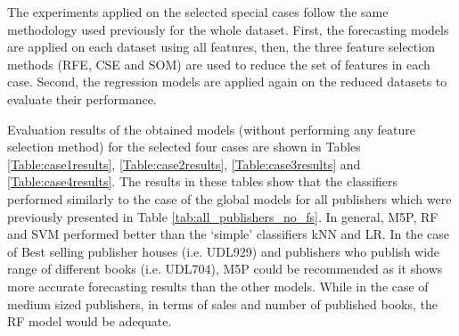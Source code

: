 \documentclass[a4paper,10pt,twocolumn,preprint,3p]{elsarticle}
\begin{document}
The experiments applied on the selected special cases follow the same methodology used previously for the whole dataset. First, the forecasting models are applied on each dataset using all features, then, the three feature selection methods (RFE, CSE and SOM) are used to reduce the set of features in each case. Second, the regression models are applied again on the reduced datasets to evaluate their performance.

Evaluation results of the obtained models (without performing any feature selection method) for the selected four cases are shown in Tables \ref{Table:case1results}, \ref{Table:case2results}, \ref{Table:case3results} and \ref{Table:case4results}. The results in these tables show that the classifiers performed similarly to the case of the global models for all publishers which were previously presented in Table \ref{tab:all_publishers_no_fs}. In general, M5P, RF and SVM performed better than the `simple' classifiers kNN and LR. In the case of Best selling publisher houses (i.e. UDL929) and publishers who publish wide range of different books (i.e. UDL704), M5P could be recommended as it shows more accurate forecasting results than the other models. While in the case of medium sized publishers, in terms of sales and number of published books, the RF model would be adequate.


\begin{table*}
\caption{Predicting Total sales for publishing company UDL929 (The best selling publishing company). Best values in bold. }
\centering{}%
\label{Table:case1results}
\end{table*}
\end{document}
